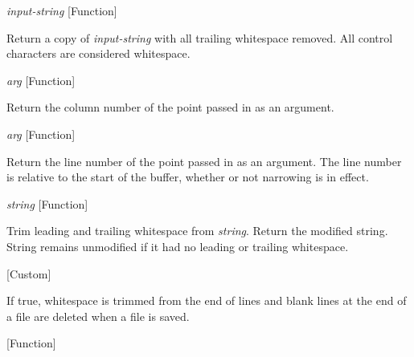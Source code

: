 \vspace{1em}
\noindent
{}
\usebox{\funcname}\emph{input-string}
 \hfill [Function]

\begin{doc-string}
Return a copy of \emph{input-string} with all trailing whitespace removed.  All control
characters are considered whitespace.
\end{doc-string}

\vspace{1em}
\noindent
{}
\usebox{\funcname}\emph{arg}
 \hfill [Function]

\begin{doc-string}
Return the column number of the point passed in as an argument.
\end{doc-string}

\vspace{1em}
\noindent
{}
\usebox{\funcname}\emph{arg}
 \hfill [Function]

\begin{doc-string}
Return the line number of the point passed in as an argument.  The line number is
relative to the start of the buffer, whether or not narrowing is in effect.
\end{doc-string}

\vspace{1em}
\noindent
{}
\usebox{\funcname}\emph{string}
 \hfill [Function]

\begin{doc-string}
Trim leading and trailing whitespace from \emph{string}.  Return the modified
string.  String remains unmodified if it had no leading or trailing whitespace.
\end{doc-string}

\vspace{1em}
\noindent
{}
\usebox{\funcname}
 \hfill [Custom]

\begin{doc-string}
If true, whitespace is trimmed from the end of lines and blank lines at the
end of a file are deleted when a file is saved.
\end{doc-string}

\vspace{1em}
\noindent
{}
\usebox{\funcname}
 \hfill [Function]

